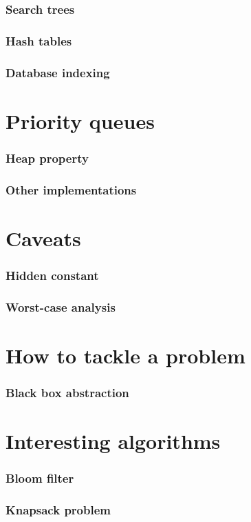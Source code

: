 \documentclass{beamer}
\begin{document}
\begin{frame}
 \frametitle{Search trees}
\end{frame}

\begin{frame}
 \frametitle{Hash tables}
\end{frame}

\begin{frame}
 \frametitle{Database indexing}
\end{frame}

\section{Priority queues}

\begin{frame}
 \frametitle{Heap property}
\end{frame}

\begin{frame}
 \frametitle{Other implementations}
\end{frame}

\section{Caveats}

\begin{frame}
 \frametitle{Hidden constant}
\end{frame}

\begin{frame}
 \frametitle{Worst-case analysis}
\end{frame}

\section{How to tackle a problem}

\begin{frame}
 \frametitle{Black box abstraction}
\end{frame}

\section{Interesting algorithms}

\begin{frame}
 \frametitle{Bloom filter}
\end{frame}

\begin{frame}
 \frametitle{Knapsack problem}
\end{frame}
\end{document}
